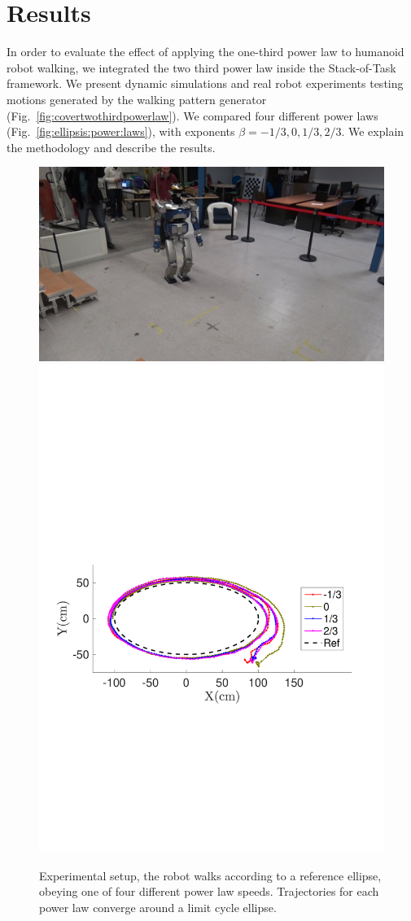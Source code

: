 \section{Results}
In order to evaluate the effect of applying the one-third power law to humanoid robot walking, we integrated the two third power law inside the Stack-of-Task framework. We present dynamic simulations and real robot experiments testing motions generated by the walking pattern generator (Fig.~\ref{fig:covertwothirdpowerlaw}). We compared four different power laws (Fig.~\ref{fig:ellipsis:power:laws}), with exponents $\beta=-1/3,0,1/3,2/3$. We explain the methodology and describe the results.

\begin{figure}[ht]
	\begin{center}
	  \includegraphics[height=0.25\linewidth]{./figures/RobotWalking.pdf} \hfill
	  \includegraphics[trim=2cm 9cm 0cm 12cm,clip=true,height=0.25\linewidth] 
	    {./figures/Fig5d_EXPshapesSymmetric.pdf}
  \end{center}
	\caption{Experimental setup, the robot walks according to a reference ellipse, obeying one of four different power law speeds. Trajectories for each power law converge around a limit cycle ellipse. }
	\label{fig:5def}
\end{figure}



